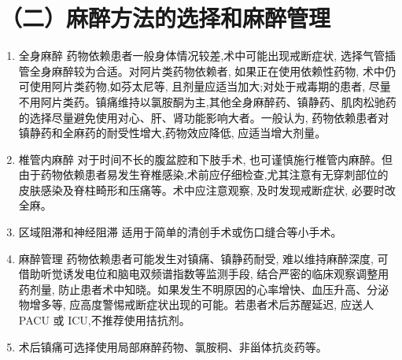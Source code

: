 \documentclass[10pt]{article}
\begin{document}
\section*{（二）麻醉方法的选择和麻醉管理}
\begin{enumerate}
  \item 全身麻醉 药物依赖患者一般身体情况较差,术中可能出现戒断症状, 选择气管插管全身麻醉较为合适。对阿片类药物依赖者, 如果正在使用依赖性药物, 术中仍可使用阿片类药物,如芬太尼等, 且剂量应适当加大;对处于戒毒期的患者, 尽量不用阿片类药。镇痛维持以氯胺酮为主,其他全身麻醉药、镇静药、肌肉松驰药的选择尽量避免使用对心、肝、肾功能影响大者。一般认为, 药物依赖患者对镇静药和全麻药的耐受性增大,药物效应降低, 应适当增大剂量。

  \item 椎管内麻醉 对于时间不长的腹盆腔和下肢手术, 也可谨慎施行椎管内麻醉。但由于药物依赖患者易发生脊椎感染,术前应仔细检查,尤其注意有无穿刺部位的皮肤感染及脊柱畸形和压痛等。术中应注意观察, 及时发现戒断症状, 必要时改全麻。

  \item 区域阻滞和神经阻滞 适用于简单的清创手术或伤口缝合等小手术。

  \item 麻醉管理 药物依赖患者可能发生对镇痛、镇静药耐受, 难以维持麻醉深度, 可借助听觉诱发电位和脑电双频谱指数等监测手段, 结合严密的临床观察调整用药剂量, 防止患者术中知晓。如果发生不明原因的心率增快、血压升高、分泌物增多等, 应高度警惕戒断症状出现的可能。若患者术后苏醒延迟, 应送人 PACU 或 ICU,不推荐使用拮抗剂。

  \item 术后镇痛可选择使用局部麻醉药物、氯胺秱、非甾体抗炎药等。

\end{enumerate}
\end{document}
